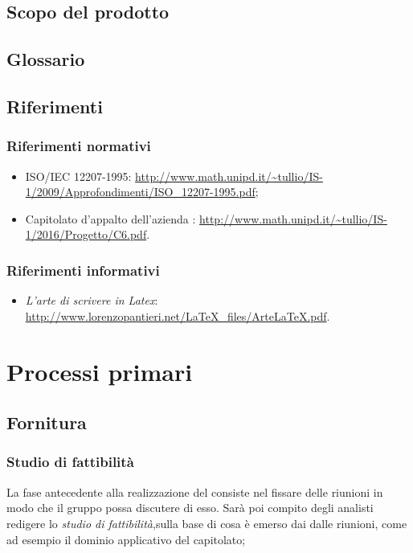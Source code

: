 \subsection{Scopo del prodotto}
\scopo

\subsection{Glossario}
\presgloss

\subsection{Riferimenti}

\subsubsection{Riferimenti normativi}
\begin{itemize}
	\item ISO/IEC 12207-1995: \url{http://www.math.unipd.it/\~tullio/IS-1/2009/Approfondimenti/ISO_12207-1995.pdf};
	\item Capitolato d'appalto dell'azienda \ZU: \url{http://www.math.unipd.it/~tullio/IS-1/2016/Progetto/C6.pdf}. %
\end{itemize}

\subsubsection{Riferimenti informativi}
\begin{itemize}
	\item \emph{L'arte di scrivere in Latex}: \url{http://www.lorenzopantieri.net/LaTeX_files/ArteLaTeX.pdf}.
\end{itemize}




\section{Processi primari} \label{sec:primari}

\subsection{Fornitura}

	\subsubsection{Studio di fattibilità}
	La fase antecedente alla realizzazione del  consiste nel fissare delle riunioni in modo che il gruppo possa discutere di esso. Sarà poi compito degli analisti redigere lo \textit{studio di fattibilità},sulla base di cosa è emerso dai dalle riunioni, come ad esempio il dominio applicativo del capitolato;

